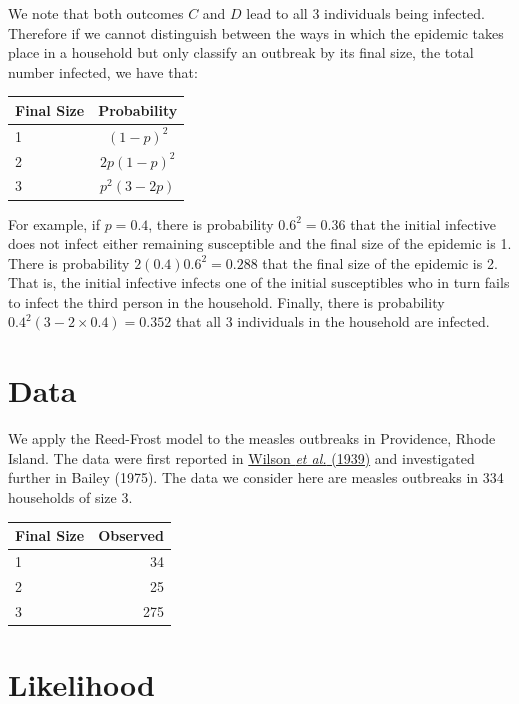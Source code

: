 \documentclass[
]{book}
\begin{document}
We note that both outcomes \(C\) and \(D\) lead to all 3 individuals being infected. Therefore if we cannot distinguish between the ways in which the epidemic takes place in a household but only classify an outbreak by its final size, the total number infected, we have that:

\begin{longtable}[]{@{}lc@{}}
\toprule()
Final Size & Probability \\
\midrule()
\endhead
1 & \((1-p)^2\) \\
2 & \(2p(1-p)^2\) \\
3 & \(p^2(3-2p)\) \\
\bottomrule()
\end{longtable}

For example, if \(p=0.4\), there is probability \(0.6^2 = 0.36\) that the initial infective does not infect either remaining susceptible and the final size of the epidemic is 1. There is probability \(2 (0.4) 0.6^2 = 0.288\) that the final size of the epidemic is 2. That is, the initial infective infects one of the initial susceptibles who in turn fails to infect the third person in the household. Finally, there is probability \(0.4^2 (3-2\times 0.4) = 0.352\) that all 3 individuals in the household are infected.

\hypertarget{sec_data}{%
\section{Data}\label{sec_data}}

We apply the Reed-Frost model to the measles outbreaks in Providence, Rhode Island. The data were first reported in \href{https://www.jstor.org/stable/984949\#metadata_info_tab_contents}{Wilson \emph{et al.} (1939)} and investigated further in Bailey (1975). The data we consider here are measles outbreaks in 334 households of size 3.

\begin{longtable}[]{@{}lr@{}}
\toprule()
Final Size & Observed \\
\midrule()
\endhead
1 & 34 \\
2 & 25 \\
3 & 275 \\
\bottomrule()
\end{longtable}

\hypertarget{sec_like}{%
\section{Likelihood}\label{sec_like}}
\end{document}
